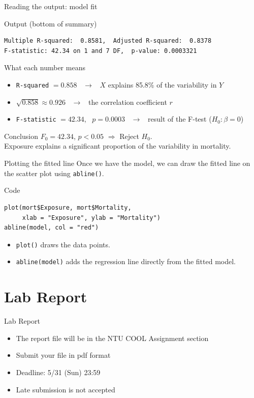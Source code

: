 \documentclass[aspectratio=169]{beamer}
\begin{document}
\begin{frame}[fragile]{Reading the output: model fit}
\begin{exampleblock}{Output (bottom of summary)}
\begin{lstlisting}[numbers=none]
Multiple R-squared:  0.8581,  Adjusted R-squared:  0.8378 
F-statistic: 42.34 on 1 and 7 DF,  p-value: 0.0003321
\end{lstlisting}
\end{exampleblock}
\begin{block}{What each number means}
\begin{itemize}
  \item \texttt{R-squared} $= 0.858$ \ $\rightarrow$ \ $X$ explains 85.8\% of the variability in $Y$
  \item $\sqrt{0.858} \approx 0.926$ \ $\rightarrow$ \ the correlation coefficient $r$
  \item \texttt{F-statistic} $= 42.34$, \ $p = 0.0003$ \ $\rightarrow$ \ result of the F-test ($H_0: \beta = 0$)
\end{itemize}
\end{block}
\begin{alertblock}{Conclusion}
$F_0 = 42.34$, $p < 0.05$ $\Rightarrow$ Reject $H_0$.\\
Exposure explains a significant proportion of the variability in mortality.
\end{alertblock}
\end{frame}


\begin{frame}[fragile]{Plotting the fitted line}
Once we have the model, we can draw the fitted line on the scatter plot using \texttt{abline()}.\\
\vspace{4pt}
\begin{block}{Code}
\begin{lstlisting}
plot(mort$Exposure, mort$Mortality,
     xlab = "Exposure", ylab = "Mortality")
abline(model, col = "red")
\end{lstlisting}
\end{block}
\vspace{2pt}
\begin{itemize}
  \item \texttt{plot()} draws the data points.
  \item \texttt{abline(model)} adds the regression line directly from the fitted model.
\end{itemize}
\end{frame}




\section{Lab Report}
\begin{frame}{Lab Report}
\begin{itemize}
    \item The report file will be in the NTU COOL Assignment section
    \item Submit your file in pdf format
    \item Deadline: 5/31 (Sun) 23:59
    \item Late submission is not accepted
\end{itemize}
\end{frame}
\end{document}
